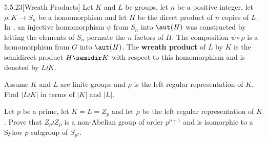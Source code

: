 \begin{spex}{5.5.23}[Wreath Products]
    Let $K$ and $L$ be groups, let $n$ be a positive integer, let $\rho : K \to S_n$ be a homomorphism and let $H$ be the direct product of $n$ copies of $L$.
	In , an injective homomorphism $\psi$ from $S_n$ into $\aut(H)$ was constructed by letting the elements of $S_n$ permute the $n$ factors of $H$.
	The composition $\psi \circ \rho$ is a homomorphism from $G$ into $\aut(H)$.
	The \textbf{wreath product} of $L$ by $K$ is the semidirect product $H \semidir K$ with respect to this homomorphism and is denoted by $L \wr K$.
    
    \begin{subexercises}
        \item Assume $K$ and $L$ are finite groups and $\rho$ is the left regular representation of $K$.
	    Find $|L \wr K|$ in terms of $|K|$ and $|L|$.
        \item Let $p$ be a prime, let $K = L = Z_p$ and let $\rho$ be the left regular representation of $K$.
	    Prove that $Z_p \wr Z_p$ is a non-Abelian group of order $p^{p+1}$ and is isomorphic to a Sylow $p$-subgroup of $S_{p^2}$.
        
    \end{subexercises}
\end{spex}

